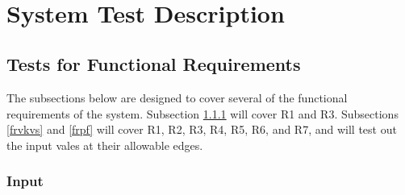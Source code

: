 \documentclass[12pt, titlepage]{article}
\begin{document}

~\newpage	 

\section{System Test Description} \label{systest}

\subsection{Tests for Functional Requirements}

\label{testfr}

The subsections below are designed to cover several of the functional
requirements of the system. Subsection \ref{frinput} will cover R1 and
R3. Subsections \ref{frvkvs} and \ref{frpf} will cover R1, R2, R3, R4, R5, R6,
and R7, and will test out the input vales at their allowable edges.

\subsubsection{Input}
\label{frinput}
		
\end{document}
